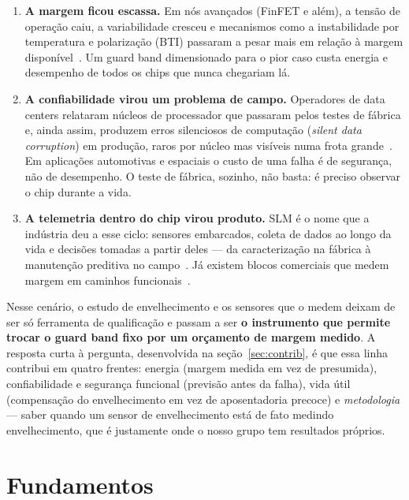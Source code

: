 \documentclass[11pt,a4paper]{article}
\begin{document}
\begin{enumerate}
  \item \textbf{A margem ficou escassa.} Em nós avançados (FinFET e além), a tensão de operação caiu, a variabilidade
        cresceu e mecanismos como a instabilidade por temperatura e polarização (BTI) passaram a pesar mais em relação à
        margem disponível~\cite{babu2025extending,seok2018recent}. Um guard band dimensionado para o pior caso custa
        energia e desempenho de todos os chips que nunca chegariam lá.
  \item \textbf{A confiabilidade virou um problema de campo.} Operadores de data centers relataram núcleos de processador que
        passaram pelos testes de fábrica e, ainda assim, produzem erros silenciosos de computação (\emph{silent data
        corruption}) em produção, raros por núcleo mas visíveis numa frota grande~\cite{hochschild2021cores,dixit2021sdc}. Em aplicações automotivas e espaciais o custo de uma falha é de
        segurança, não de desempenho. O teste de fábrica, sozinho, não basta: é preciso observar o chip durante a vida.
  \item \textbf{A telemetria dentro do chip virou produto.} SLM é o nome que a indústria deu a esse ciclo: sensores
        embarcados, coleta de dados ao longo da vida e decisões tomadas a partir deles --- da caracterização na fábrica à
        manutenção preditiva no campo~\cite{kashyap2021slm,tahoori2024future}. Já existem blocos comerciais que medem
        margem em caminhos funcionais~\cite{synopsysPMM}.
\end{enumerate}

Nesse cenário, o estudo de envelhecimento e os sensores que o medem deixam de ser só ferramenta de qualificação e passam a
ser \textbf{o instrumento que permite trocar o guard band fixo por um orçamento de margem medido}. A resposta curta à
pergunta, desenvolvida na seção~\ref{sec:contrib}, é que essa linha contribui em quatro frentes: energia (margem medida em
vez de presumida), confiabilidade e segurança funcional (previsão antes da falha), vida útil (compensação do envelhecimento
em vez de aposentadoria precoce) e \emph{metodologia} --- saber quando um sensor de envelhecimento está de fato medindo
envelhecimento, que é justamente onde o nosso grupo tem resultados próprios.

\section{Fundamentos}
\end{document}
